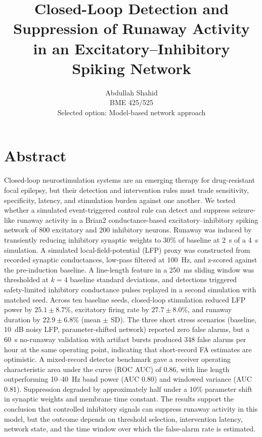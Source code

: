 \documentclass[12pt]{article}
\title{\textbf{Closed-Loop Detection and Suppression of Runaway Activity in an Excitatory--Inhibitory Spiking Network}}
\author{Abdullah Shahid\\BME 425/525\\Selected option: Model-based network approach}
\date{}
\begin{document}
\maketitle

\section*{Abstract}
Closed-loop neurostimulation systems are an emerging therapy for drug-resistant focal epilepsy, but their detection and intervention rules must trade sensitivity, specificity, latency, and stimulation burden against one another. We tested whether a simulated event-triggered control rule can detect and suppress seizure-like runaway activity in a Brian2 conductance-based excitatory--inhibitory spiking network of 800 excitatory and 200 inhibitory neurons. Runaway was induced by transiently reducing inhibitory synaptic weights to 30\% of baseline at 2~s of a 4~s simulation. A simulated local-field-potential (LFP) proxy was constructed from recorded synaptic conductances, low-pass filtered at 100~Hz, and z-scored against the pre-induction baseline. A line-length feature in a 250~ms sliding window was thresholded at \(k=4\) baseline standard deviations, and detections triggered safety-limited inhibitory conductance pulses replayed in a second simulation with matched seed. Across ten baseline seeds, closed-loop stimulation reduced LFP power by \(25.1\pm8.7\)\%, excitatory firing rate by \(27.7\pm8.0\)\%, and runaway duration by \(22.9\pm6.8\)\% (mean \(\pm\) SD). The three short stress scenarios (baseline, 10~dB noisy LFP, parameter-shifted network) reported zero false alarms, but a 60~s no-runaway validation with artifact bursts produced \(348\) false alarms per hour at the same operating point, indicating that short-record FA estimates are optimistic. A mixed-record detector benchmark gave a receiver operating characteristic area under the curve (ROC AUC) of 0.86, with line length outperforming 10--40~Hz band power (AUC 0.80) and windowed variance (AUC 0.81). Suppression degraded by approximately half under a 10\% parameter shift in synaptic weights and membrane time constant. The results support the conclusion that controlled inhibitory signals can suppress runaway activity in this model, but the outcome depends on threshold selection, intervention latency, network state, and the time window over which the false-alarm rate is estimated.
\end{document}
